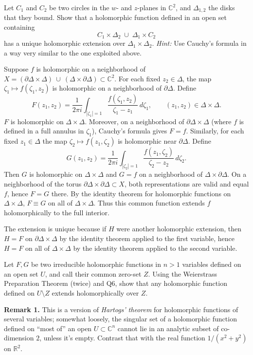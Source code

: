 \documentclass[12pt]{article}  %
\begin{document}
\begin{problem}{6}
Let $C_1$ and $C_2$ be two circles in the $w$- and $z$-planes in $\mathbb{C}^2$, and $\Delta_{1,2}$ the disks that they bound. Show that a holomorphic function defined in an open set containing
\[
    C_1 \times \Delta_2 \;\cup\; \Delta_1 \times C_2
\]
has a unique holomorphic extension over $\Delta_1 \times \Delta_2$.
\emph{Hint:} Use Cauchy's formula in a way very similar to the one exploited above.
\end{problem}

\begin{solution}
    Suppose $f$ is holomorphic on a neighborhood of $X = (\partial\Delta\times \Delta)\ \cup\ (\Delta\times \partial\Delta)\subset\mathbb{C}^2$. For each fixed $z_2\in\Delta$, the map $\zeta_1\mapsto f(\zeta_1,z_2)$ is holomorphic on a neighborhood of $\partial\Delta$. Define
    \[
        F(z_1,z_2) = \frac{1}{2\pi i}\int_{|\zeta_1|=1}\frac{f(\zeta_1,z_2)}{\zeta_1-z_1}\,d\zeta_1, \qquad (z_1,z_2)\in\Delta\times\Delta.
    \]
    $F$ is holomorphic on $\Delta\times\Delta$. Moreover, on a neighborhood of $\partial\Delta\times\Delta$ (where $f$ is defined in a full annulus in $\zeta_1$), Cauchy's formula gives $F=f$. Similarly, for each fixed $z_1\in\Delta$ the map $\zeta_2\mapsto f(z_1,\zeta_2)$ is holomorphic near $\partial\Delta$. Define
    \[
        G(z_1,z_2) = \frac{1}{2\pi i}\int_{|\zeta_2|=1}\frac{f(z_1,\zeta_2)}{\zeta_2-z_2}\,d\zeta_2.
    \]
    Then $G$ is holomorphic on $\Delta\times\Delta$ and $G=f$ on a neighborhood of $\Delta\times\partial\Delta$. On a neighborhood of the torus $\partial\Delta\times\partial\Delta\subset X$, both representations are valid and equal $f$, hence $F=G$ there. By the identity theorem for holomorphic functions on $\Delta\times\Delta$, $F\equiv G$ on all of $\Delta\times\Delta$. Thus this common function extends $f$ holomorphically to the full interior.

    The extension is unique because if $H$ were another holomorphic extension, then $H=F$ on $\partial\Delta\times\Delta$ by the identity theorem applied to the first variable, hence $H=F$ on all of $\Delta\times\Delta$ by the identity theorem applied to the second variable.
\end{solution}



\begin{problem}{7}
Let $F,G$ be two irreducible holomorphic functions in $n>1$ variables defined on an open set $U$, and call their common zero-set $Z$. Using the Weierstrass Preparation Theorem (twice) and Q6, show that any holomorphic function defined on $U\setminus Z$ extends holomorphically over $Z$.

\medskip
\noindent \textbf{Remark 1.} This is a version of \emph{Hartogs' theorem} for holomorphic functions of several variables; somewhat loosely, the singular set of a holomorphic function defined on ``most of'' an open $U \subset \mathbb{C}^n$ cannot lie in an analytic subset of co-dimension $2$, unless it’s empty. Contrast that with the real function $1/(x^2+y^2)$ on $\mathbb{R}^2$.
\end{problem}
\end{document}
